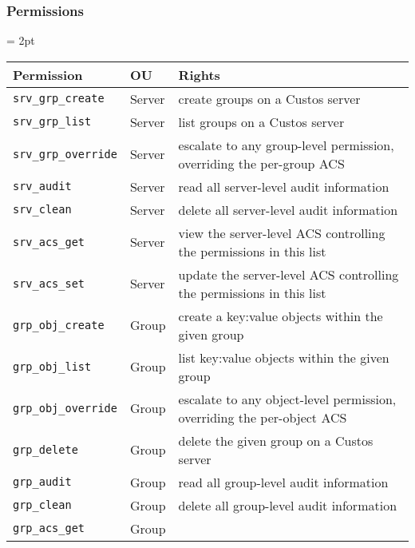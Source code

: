 \subsubsection{Permissions}
\label{chap:custos:arch:ac:perms}

\begin{table}[!t]
  \footnotesize
  \centering
  \tabulinesep = 2pt
  \begin{tabu} to \textwidth
    { | X[1.25,l,m]
      | X[.5,l,m]
      | X[4,l,m]
      | }
    \hline
    \textbf{Permission}
    & \textbf{OU}
    & \textbf{Rights}
    \\ \hline
    \texttt{srv\_grp\_create}
    & Server
    & create groups on a Custos server
    \\ \hline
    \texttt{srv\_grp\_list}
    & Server
    & list groups on a Custos server
    \\ \hline
    \texttt{srv\_grp\_override}
    & Server
    & escalate to any group-level permission, overriding the per-group ACS
    \\ \hline
    \texttt{srv\_audit}
    & Server
    & read all server-level audit information
    \\ \hline
    \texttt{srv\_clean}
    & Server
    & delete all server-level audit information
    \\ \hline
    \texttt{srv\_acs\_get}
    & Server
    & view the server-level ACS controlling the permissions in this list
    \\ \hline
    \texttt{srv\_acs\_set}
    & Server
    & update the server-level ACS controlling the permissions in this list
    \\ \hline
    \texttt{grp\_obj\_create}
    & Group
    & create a key:value objects within the given group
    \\ \hline
    \texttt{grp\_obj\_list}
    & Group
    & list key:value objects within the given group
    \\ \hline
    \texttt{grp\_obj\_override}
    & Group
    & escalate to any object-level permission, overriding the per-object ACS
    \\ \hline
    \texttt{grp\_delete}
    & Group
    & delete the given group on a Custos server
    \\ \hline
    \texttt{grp\_audit}
    & Group
    & read all group-level audit information
    \\ \hline
    \texttt{grp\_clean}
    & Group
    & delete all group-level audit information
    \\ \hline
    \texttt{grp\_acs\_get}
    & Group

\end{tabu}
\end{table}
